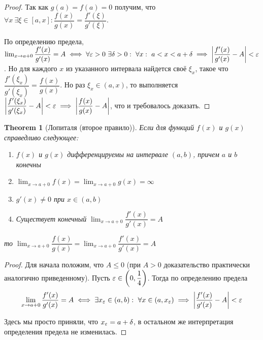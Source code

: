 \documentclass[a4paper]{article}
\theoremstyle{named}
\newtheorem*{namedtheorem}{Theorem}
\begin{document}
\begin{colloq}
\begin{proof}
			Так как $g(a) = f(a) = 0$ получим, что $\forall x \ \exists \xi \in [a, x]: \dfrac{f(x)}{g(x)} = \dfrac{f'(\xi)}{g'(\xi)}$.

			По определению предела, $\lim_{x \to a + 0} \dfrac{f'(x)}{g'(x)} = A \iff \forall \varepsilon > 0 \ \exists \delta > 0: \ \forall x: \ a < x < a + \delta \implies \left|\dfrac{f'(x)}{g'(x)} - A\right| < \varepsilon$. Но для каждого $x$ из указанного интервала найдется своё $\xi_x$, такое что $\dfrac{f'(\xi_x)}{g'(\xi_x)} = \dfrac{f(x)}{g(x)}$. Но раз $\xi_x \in (a, x)$, то выполняется $\left|\dfrac{f'(\xi_x)}{g'(\xi_x)} - A\right| < \varepsilon \implies \left|\dfrac{f(x)}{g(x)} - A\right|$, что и требовалось доказать.
		\end{proof}

		\begin{namedtheorem}[Лопиталя (второе правило)]
			Если для функций $f(x)$ и $g(x)$ справедливо следующее:

			\begin{enumerate}
				\item
				$f(x)$ и $g(x)$ дифференцируемы на интервале $(a, b)$, причем $a$ и $b$ конечны

				\item
				$\lim_{x \to a + 0} f(x) = \lim_{x \to a + 0} g(x) = \infty$

				\item
				$g'(x) \neq 0$ при $x \in (a, b)$

				\item
				Существует конечный $\lim_{x \to a + 0} \dfrac{f'(x)}{g'(x)} = A$
			\end{enumerate}

			то $\lim_{x \to a + 0} \dfrac{f(x)}{g(x)} = \lim_{x \to a + 0} \dfrac{f'(x)}{g'(x)} = A$
		\end{namedtheorem}

		\begin{proof}
			Для начала положим, что $A \leq 0$ (при $A > 0$ доказательство практически аналогично приведенному). Пусть $\varepsilon \in \left(0, \dfrac{1}{4}\right)$. Тогда по определению предела 
			\begin{equation*}
				\lim_{x \to a + 0} \dfrac{f'(x)}{g'(x)} = A \iff \exists x_{\eps} \in (a, b): \ \forall x \in (a, x_{\eps}) \implies \left|\dfrac{f'(x)}{g'(x)} - A\right| < \eps
			\end{equation*}

			Здесь мы просто приняли, что $x_{\varepsilon} = a + \delta$, в остальном же интерпретация определения предела не изменилась.


\end{proof}
\end{colloq}
\end{document}
